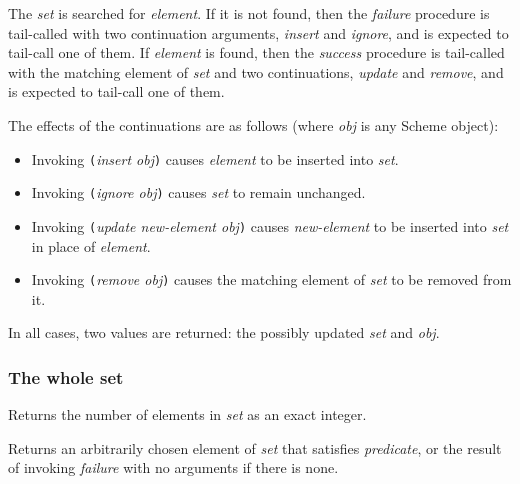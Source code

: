 \begin{entry}{%
  }

  The \emph{set} is searched for \emph{element}. If it is not found,
  then the \emph{failure} procedure is tail-called with two
  continuation arguments, \emph{insert} and \emph{ignore}, and is
  expected to tail-call one of them. If \emph{element} is found, then
  the \emph{success} procedure is tail-called with the matching
  element of \emph{set} and two continuations, \emph{update} and
  \emph{remove}, and is expected to tail-call one of them.

  The effects of the continuations are as follows (where \emph{obj} is
  any Scheme object):

  \begin{itemize}
  \item Invoking \texttt{(}\emph{insert obj}\texttt{)} causes
    \emph{element} to be inserted into \emph{set}.
  \item Invoking \texttt{(}\emph{ignore obj}\texttt{)} causes
    \emph{set} to remain unchanged.
  \item Invoking \texttt{(}\emph{update new-element obj}\texttt{)}
    causes \emph{new-element} to be inserted into \emph{set} in place
    of \emph{element}.
  \item Invoking \texttt{(}\emph{remove obj}\texttt{)} causes the
    matching element of \emph{set} to be removed from it.
  \end{itemize}

  In all cases, two values are returned: the possibly updated
  \emph{set} and \emph{obj}.
\end{entry}

\subsubsection{The whole set}

\begin{entry}{%
  }

  Returns the number of elements in \emph{set} as an exact integer.
\end{entry}

\begin{entry}{%
  }

  Returns an arbitrarily chosen element of \emph{set} that satisfies
  \emph{predicate}, or the result of invoking \emph{failure} with no
  arguments if there is none.
\end{entry}

